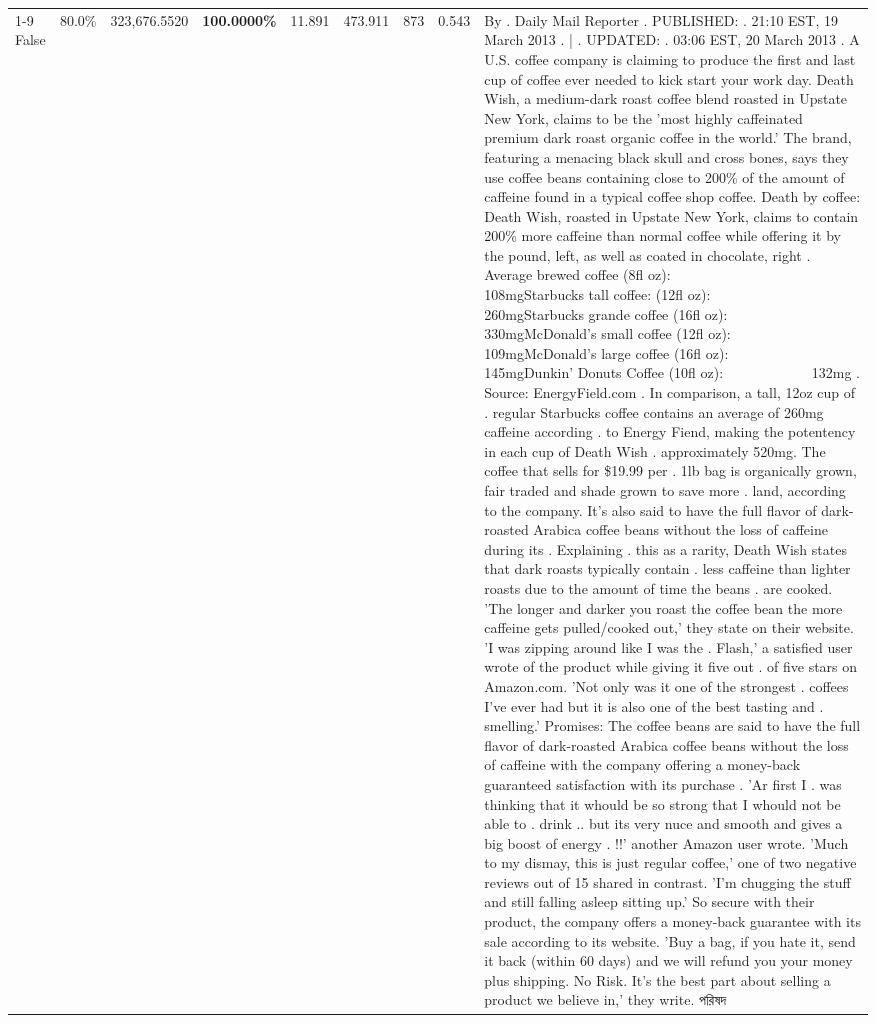 \begin{table}[H]
{\begin{tabular}{lllrlllll}
\cline{1-9}
False & 80.0\% & 323,676.5520 & \bfseries \color{red} 100.0000\% & 11.891 & 473.911 & 873 & 0.543 & By . Daily Mail Reporter . PUBLISHED: . 21:10 EST, 19 March 2013 . | . UPDATED: . 03:06 EST, 20 March 2013 . A U.S. coffee company is claiming to produce the first and last cup of coffee ever needed to kick start your work day. Death Wish, a medium-dark roast coffee blend roasted in Upstate New York, claims to be the 'most highly caffeinated premium dark roast organic coffee in the world.' The brand, featuring a menacing black skull and cross bones, says they use coffee beans containing close to 200\% of the amount of caffeine found in a typical coffee shop coffee. Death by coffee: Death Wish, roasted in Upstate New York, claims to contain 200\% more caffeine than normal coffee while offering it by the pound, left, as well as coated in chocolate, right . Average brewed coffee (8fl oz):              108mgStarbucks tall coffee: (12fl oz):                260mgStarbucks grande coffee (16fl oz):         330mgMcDonald's small coffee (12fl oz):           109mgMcDonald's large coffee (16fl oz):           145mgDunkin' Donuts Coffee (10fl oz):             132mg . Source: EnergyField.com . In comparison, a tall, 12oz cup of . regular Starbucks coffee contains an average of 260mg caffeine according . to Energy Fiend, making the potentency in each cup of Death Wish . approximately 520mg. The coffee that sells for \$19.99 per . 1lb bag is organically grown, fair traded and shade grown to save more . land, according to the company. It's also said to have the full flavor of dark-roasted Arabica coffee beans without the loss of caffeine during its . Explaining . this as a rarity, Death Wish states that dark roasts typically contain . less caffeine than lighter roasts due to the amount of time the beans . are cooked. 'The longer and darker you roast the coffee bean the more caffeine gets pulled/cooked out,' they state on their website. 'I was zipping around like I was the . Flash,' a satisfied user wrote of the product while giving it five out . of five stars on Amazon.com. 'Not only was it one of the strongest . coffees I've ever had but it is also one of the best tasting and . smelling.’ Promises: The coffee beans are said to have the full flavor of dark-roasted Arabica coffee beans without the loss of caffeine with the company offering a money-back guaranteed satisfaction with its purchase . 'Ar first I . was thinking that it whould be so strong that I whould not be able to . drink .. but its very nuce and smooth and gives a big boost of energy . !!' another Amazon user wrote. 'Much to my dismay, this is just regular coffee,' one of two negative reviews out of 15 shared in contrast. 'I'm chugging the stuff and still falling asleep sitting up.' So secure with their product, the company offers a money-back guarantee with its sale according to its website. 'Buy a bag, if you hate it, send it back (within 60 days) and we will refund you your money plus shipping. No Risk. It’s the best part about selling a product we believe in,' they write. পরিষদ \\

\end{tabular}}
\end{table}
